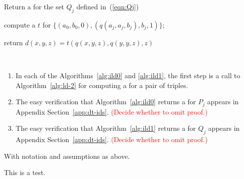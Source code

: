 \LinesNumbered
\begin{algorithm}%
  \caption{Return a \ldto for the set $Q_j$ defined in~(\ref{eqn:Qj})
  \label{alg:ild1}}

  compute a \ldto $t$ for $\{(a_0, b_0, 0), (q(a_j, a_j, b_j), b_j, 1)\}$;

  return $d(x,y,z) = t(q(x,y,z), q(y,y,z), z)$
\end{algorithm}

\begin{remarks}\
\begin{enumerate}[1.]
\item In each of the Algorithms~\ref{alg:ild0} and \ref{alg:ild1},
the first step is a call to Algorithm~\ref{alg:ld-2}
for computing a \ldto for a pair of triples.
\item The easy verification that Algorithm~\ref{alg:ild0} returns
a \ldto for $P_j$ appears in Appendix Section~\ref{app:dt-ids}.
\textcolor{red}{(Decide whether to omit proof.)}
\item The easy verification that Algorithm~\ref{alg:ild1} returns
a \ldto for $Q_j$ appears in Appendix Section~\ref{app:dt-ids}.
\textcolor{red}{(Decide whether to omit proof.)}
\end{enumerate}
\end{remarks}


























With notation and assumptions as above.

\begin{theorem}
This is a test.
\end{theorem}







%




